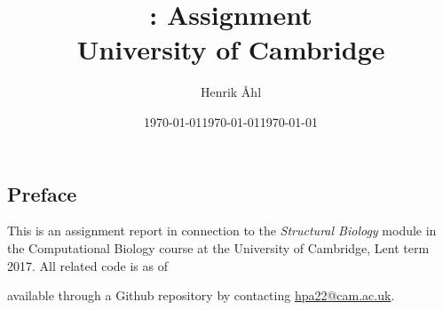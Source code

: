\documentclass[11pt]{article}\usepackage[]{graphicx}\usepackage[]{color}
\title{
  \bf \course: Assignment \ass \\[1em]
  \small{University of Cambridge}
}
\author{Henrik Åhl}
\date{\today}
\theoremstyle{plain}
\newcommand{\course}{Structural Biology}
\newcommand{\term}{Lent term 2017}
\begin{document}
\date{\today}
\maketitle
\setcounter{page}{1}


\maketitle

\begin{multicols*}{2}
\section*{Preface}
This is an assignment report in connection to the \textit{\course}
module in the Computational Biology course at the University of Cambridge,
\term. All related code is as of \date{\today} available through a
Github repository by contacting \href{mailto:hpa22@cam.ac.uk}{hpa22@cam.ac.uk}.


\end{multicols*}
\end{document}
